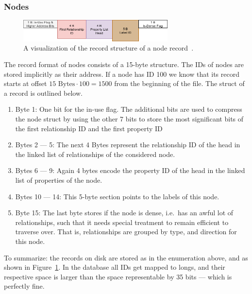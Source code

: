         \subsubsection*{Nodes}
            \begin{figure}[htp]
                \begin{center}
                    \includegraphics[keepaspectratio,height=0.4\textheight,width=0.7\textwidth]{img/04-databases/node_record.png}
                \end{center}
                \caption{A visualization of the record structure of a node record~\autocite{neo4jNodeRecordFormat}.}
                \label{node-record-format}
            \end{figure}
            The record format of nodes consists of a 15-byte structure.
            The IDs of nodes are stored implicitly as their address.
            If a node has ID 100 we know that its record starts at offset $15 \text{ Bytes} \cdot 100 = 1500$ from the beginning of the file.
            The struct of a record is outlined below.
            \begin{enumerate}
                \item Byte 1: One bit for the in-use flag. 
                The additional bits are used to compress the node struct by using the other 7 bits to store the most significant bits of the first relationship ID and the first property ID 
                \item Bytes 2 --- 5: The next 4 Bytes represent the relationship ID of the head in the linked list of relationships of the considered node.
                \item Bytes 6 --- 9: Again 4 bytes encode the property ID of the head in the linked list of properties of the node.
                \item Bytes 10 --- 14: This 5-byte section points to the labels of this node.
                \item Byte 15: The last byte stores if the node is dense, i.e.\ has an awful lot of relationships, such that it needs special treatment to remain efficient to traverse over.
                That is, relationships are grouped by type, and direction for this node.
            \end{enumerate}
            
            To summarize: the records on disk are stored as in the enumeration above, and as shown in Figure~\ref{node-record-format}. 
            In the database all IDs get mapped to longs, and their respective space is larger than the space representable by 35 bits --- which is perfectly fine.
            
